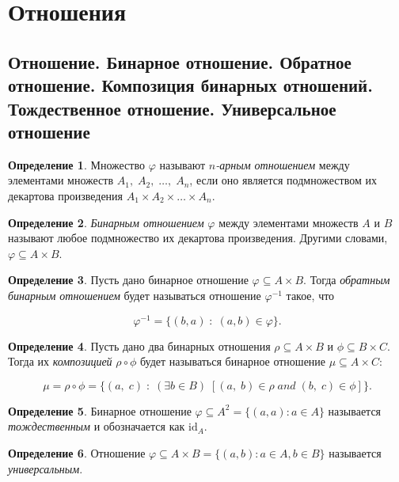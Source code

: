 \documentclass{article}
\theoremstyle{plain}
\theoremstyle{definition}
\newtheorem{definition}{Определение}[subsection]
\begin{document}
\section{Отношения}

\subsection{Отношение. Бинарное отношение. Обратное отношение. Композиция бинарных отношений. Тождественное отношение. Универсальное отношение}

\begin{definition}
	Множество \(\varphi\) называют \textit{\(n\)-арным отношением} между элементами множеств \(A_1,\; A_2,\; \ldots,\; A_n\), если оно является подмножеством их декартова произведения \(A_1 \times A_2 \times \ldots \times A_n\).
\end{definition}

\begin{definition}
	\textit{Бинарным отношением} \(\varphi\) между элементами множеств \(A\) и \(B\) называют любое подмножество их декартова произведения. Другими словами, \(\varphi \subseteq A \times B\).
\end{definition}

\begin{definition}
	Пусть дано бинарное отношение \(\varphi \subseteq A \times B\). Тогда \textit{обратным бинарным отношением} будет называться отношение \(\varphi^{-1}\) такое, что

	\[
		\varphi^{-1} = \{(b, a) \;:\; (a, b) \in \varphi\}.
	\]
\end{definition}

\begin{definition}
	Пусть дано два бинарных отношения \(\rho \subseteq A \times B\) и \(\phi \subseteq B \times C\). Тогда их \textit{композицией} \(\rho \circ \phi\) будет называться бинарное отношение \(\mu \subseteq A \times C\):

	\[
		\mu = \rho \circ \phi = \{(a,\; c) \;\colon\; (\exists b \in B)\; [(a,\; b) \in \rho \;and\; (b,\; c) \in \phi]\}.
	\]
\end{definition}

\begin{definition}
	Бинарное отношение \(\varphi \subseteq A^2 = \{(a, a) \colon a \in A\}\) называется \textit{тождественным} и обозначается как \(\mathrm{id}_A\).
\end{definition}

\begin{definition}
	Отношение \(\varphi \subseteq A \times B = \{(a, b) \colon a \in A, b \in B\}\) называется \textit{универсальным}.
\end{definition}
\end{document}
